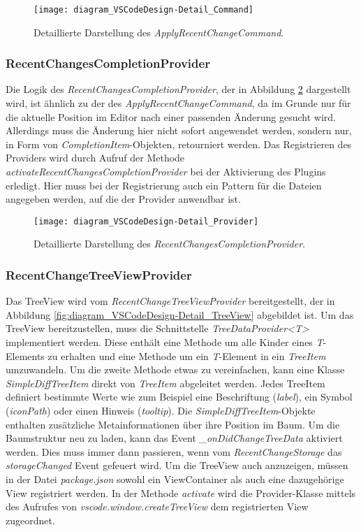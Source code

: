 \begin{figure}
    \centering
    \texttt{[image: diagram\_VSCodeDesign-Detail\_Command]}
    \caption{Detaillierte Darstellung des \emph{ApplyRecentChangeCommand}.}
    \label{fig:diagram_VSCodeDesign-Detail_Command}
\end{figure}   

\subsubsection{RecentChangesCompletionProvider}

Die Logik des \emph{RecentChangesCompletionProvider}, 
der in Abbildung \ref{fig:diagram_VSCodeDesign-Detail_Provider} dargestellt wird,
ist ähnlich
zu der des \emph{ApplyRecentChangeCommand}, da im Grunde nur für
die aktuelle Position im Editor nach einer passenden Änderung 
gesucht wird. Allerdings muss die Änderung hier nicht sofort
angewendet werden, sondern nur, in Form von \emph{CompletionItem}-Objekten,
retourniert werden. Das Registrieren des Providers wird durch
Aufruf der Methode \emph{activateRecentChangesCompletionProvider} bei
der Aktivierung des Plugins erledigt. Hier muss bei der Registrierung
auch ein Pattern für die Dateien angegeben werden, auf die der Provider
anwendbar ist.

\begin{figure}
    \centering
    \texttt{[image: diagram\_VSCodeDesign-Detail\_Provider]}
    \caption{Detaillierte Darstellung des \emph{RecentChangesCompletionProvider}.}
    \label{fig:diagram_VSCodeDesign-Detail_Provider}
\end{figure}   

\subsubsection{RecentChangeTreeViewProvider}

Das TreeView wird vom \emph{RecentChangeTreeViewProvider} bereitgestellt,
der in Abbildung \ref{fig:diagram_VSCodeDesign-Detail_TreeView} abgebildet ist.
Um das TreeView bereitzustellen, muss die Schnittstelle
\emph{TreeDataProvider<T>} implementiert werden. Diese
enthält eine Methode um alle Kinder eines \emph{T}-Elements
zu erhalten und eine Methode um ein \emph{T}-Element in
ein \emph{TreeItem} umzuwandeln. Um die zweite Methode etwas zu
vereinfachen, kann eine Klasse \emph{SimpleDiffTreeItem} direkt
von \emph{TreeItem} abgeleitet werden. Jedes TreeItem definiert
bestimmte Werte wie zum Beispiel eine Beschriftung (\emph{label}), 
ein Symbol (\emph{iconPath}) oder einen Hinweis (\emph{tooltip}).
Die \emph{SimpleDiffTreeItem}-Objekte enthalten zusätzliche
Metainformationen über ihre Position im Baum. Um die Baumstruktur
neu zu laden, kann das Event \emph{\_onDidChangeTreeData} aktiviert
werden. Dies muss immer dann passieren, wenn vom \emph{RecentChangeStorage}
das \emph{storageChanged} Event gefeuert wird.
Um die TreeView auch anzuzeigen, müssen in der Datei \emph{package.json}
sowohl ein ViewContainer als auch eine dazugehörige View registriert werden.
In der Methode \emph{activate} wird die Provider-Klasse mittels
des Aufrufes von \emph{vscode.window.createTreeView} dem registrierten
View zugeordnet.

